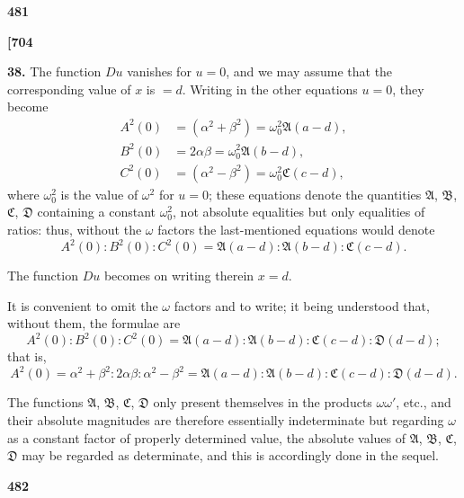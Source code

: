 \documentclass[12pt,a4paper]{article}
\theoremstyle{definition}
\begin{document}
\begin{center}
\textbf{481}
\end{center}

\vspace{0.5em}

\noindent\textbf{[704}

\vspace{0.5em}

\noindent\textbf{38.}\quad
The function $Du$ vanishes for $u = 0$, and we may assume that the corresponding value of $x$ is $= d$. Writing in the other equations $u = 0$, they become
\begin{align*}
A^2(0) &= (\alpha^2 + \beta^2) = \omega_0^2 \mathfrak{A}(a - d), \\
B^2(0) &= 2\alpha\beta = \omega_0^2 \mathfrak{A}(b - d), \\
C^2(0) &= (\alpha^2 - \beta^2) = \omega_0^2 \mathfrak{C}(c - d),
\end{align*}
where $\omega_0^2$ is the value of $\omega^2$ for $u = 0$; these equations denote the quantities $\mathfrak{A}$, $\mathfrak{B}$, $\mathfrak{C}$, $\mathfrak{D}$ containing a constant $\omega_0^2$, not absolute equalities but only equalities of ratios: thus, without the $\omega$ factors the last-mentioned equations would denote
\[
A^2(0) : B^2(0) : C^2(0) = \mathfrak{A}(a - d) : \mathfrak{A}(b - d) : \mathfrak{C}(c - d).
\]

The function $Du$ becomes on writing therein $x = d$.

It is convenient to omit the $\omega$ factors and to write; it being understood that, without them, the formulae are
\[
A^2(0) : B^2(0) : C^2(0) = \mathfrak{A}(a - d) : \mathfrak{A}(b - d) : \mathfrak{C}(c - d) : \mathfrak{D}(d - d);
\]
that is,
\[
A^2(0) = \alpha^2 + \beta^2 : 2\alpha\beta : \alpha^2 - \beta^2 = \mathfrak{A}(a - d) : \mathfrak{A}(b - d) : \mathfrak{C}(c - d) : \mathfrak{D}(d - d).
\]

The functions $\mathfrak{A}$, $\mathfrak{B}$, $\mathfrak{C}$, $\mathfrak{D}$ only present themselves in the products $\omega \omega'$, etc., and their absolute magnitudes are therefore essentially indeterminate but regarding $\omega$ as a constant factor of properly determined value, the absolute values of $\mathfrak{A}$, $\mathfrak{B}$, $\mathfrak{C}$, $\mathfrak{D}$ may be regarded as determinate, and this is accordingly done in the sequel.

\vspace{1em}

\begin{center}
\textbf{482}
\end{center}
\end{document}
